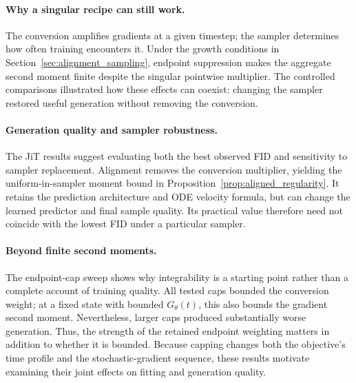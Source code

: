\documentclass{article}
\theoremstyle{plain}
\theoremstyle{definition}
\theoremstyle{remark}
\begin{document}
\paragraph{Why a singular recipe can still work.}
The conversion amplifies gradients at a given timestep; the sampler determines how often training encounters it. Under the growth conditions in Section~\ref{sec:alignment_sampling}, endpoint suppression makes the aggregate second moment finite despite the singular pointwise multiplier. The controlled comparisons illustrated how these effects can coexist: changing the sampler restored useful generation without removing the conversion.

\paragraph{Generation quality and sampler robustness.}
The JiT results suggest evaluating both the best observed FID and sensitivity to sampler replacement. Alignment removes the conversion multiplier, yielding the uniform-in-sampler moment bound in Proposition~\ref{prop:aligned_regularity}. It retains the prediction architecture and ODE velocity formula, but can change the learned predictor and final sample quality. Its practical value therefore need not coincide with the lowest FID under a particular sampler.

\paragraph{Beyond finite second moments.}
The endpoint-cap sweep shows why integrability is a starting point rather than a complete account of training quality. All tested caps bounded the conversion weight; at a fixed state with bounded $G_\theta(t)$, this also bounds the gradient second moment. Nevertheless, larger caps produced substantially worse generation. Thus, the strength of the retained endpoint weighting matters in addition to whether it is bounded. Because capping changes both the objective's time profile and the stochastic-gradient sequence, these results motivate examining their joint effects on fitting and generation quality.
\end{document}
